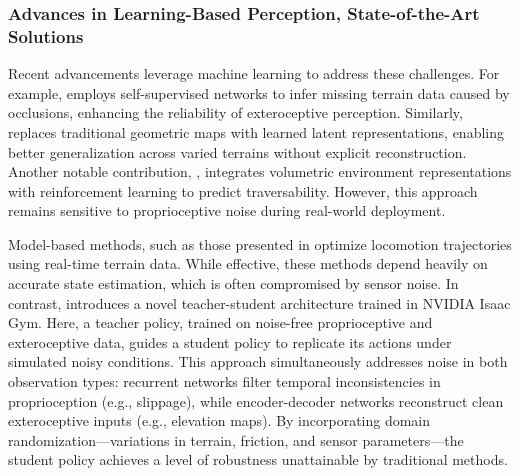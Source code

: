 \subsubsection{Advances in Learning-Based Perception, State-of-the-Art Solutions}
Recent advancements leverage machine learning to address these challenges. For example, \cite{Reconstructing_Occluded_Elevation_Information_in_Terrain_Maps_With_Self-Supervised_Learning} employs self-supervised networks to infer missing terrain data caused by occlusions, enhancing the reliability of exteroceptive perception. Similarly, \cite{Neural_Scene_Representation_for_Locomotion_on_Structured_Terrain} replaces traditional geometric maps with learned latent representations, enabling better generalization across varied terrains without explicit reconstruction. Another notable contribution, \cite{Locomotion_Policy_Guided_Traversability_Learning_using_Volumetric_Representations_of_Complex_Environments}, integrates volumetric environment representations with reinforcement learning to predict traversability. However, this approach remains sensitive to proprioceptive noise during real-world deployment.

Model-based methods, such as those presented in \cite{grandia2022perceptivelocomotionnonlinearmodel} optimize locomotion trajectories using real-time terrain data. While effective, these methods depend heavily on accurate state estimation, which is often compromised by sensor noise. In contrast, \cite{Learning_Robust_Perception-Based_Controller_for_Quadruped_Robot} introduces a novel teacher-student architecture trained in NVIDIA Isaac Gym. Here, a teacher policy, trained on noise-free proprioceptive and exteroceptive data, guides a student policy to replicate its actions under simulated noisy conditions. This approach simultaneously addresses noise in both observation types: recurrent networks filter temporal inconsistencies in proprioception (e.g., slippage), while encoder-decoder networks reconstruct clean exteroceptive inputs (e.g., elevation maps). By incorporating domain randomization—variations in terrain, friction, and sensor parameters—the student policy achieves a level of robustness unattainable by traditional methods.


